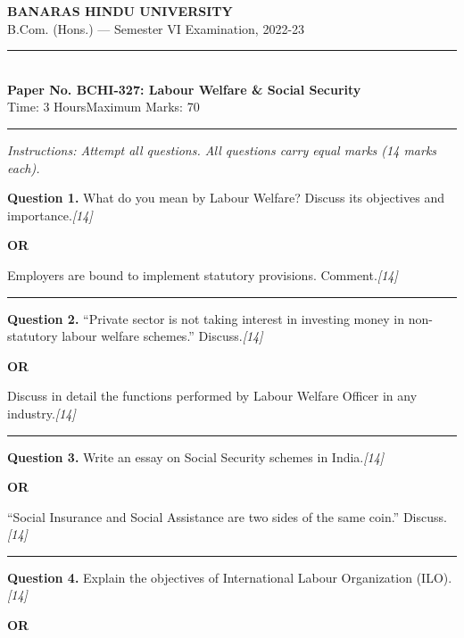 \documentclass[11pt,a4paper]{article}
\newcommand{\pts}[1]{\hfill   \textit{[#1]}}
\begin{document}
\begin{center}
  {\large\bfseries BANARAS HINDU UNIVERSITY}\\[2pt]
  {\normalsize B.Com. (Hons.) --- Semester VI Examination, 2022-23}\\[6pt]
  \rule{0.8\linewidth}{0.5pt}\\[6pt]
  {\large\bfseries Paper No. BCHI-327: Labour Welfare \& Social Security}\\[4pt]
  {\normalsize Time: 3 Hours\hfill Maximum Marks: 70}
\end{center}

\rule{\linewidth}{0.4pt}

\smallskip



\noindent   \textit{Instructions: Attempt all questions. All questions carry equal marks (14 marks each).}

\bigskip




\noindent   \textbf{Question 1.}
What do you mean by Labour Welfare? Discuss its objectives and importance.\pts{14}

\centerline{   \textbf{OR}}

Employers are bound to implement statutory provisions. Comment.\pts{14}

\medskip\rule{\linewidth}{0.2pt}




\noindent   \textbf{Question 2.}
``Private sector is not taking interest in investing money in non-statutory labour welfare schemes.'' Discuss.\pts{14}

\centerline{   \textbf{OR}}

Discuss in detail the functions performed by Labour Welfare Officer in any industry.\pts{14}

\medskip\rule{\linewidth}{0.2pt}




\noindent   \textbf{Question 3.}
Write an essay on Social Security schemes in India.\pts{14}

\centerline{   \textbf{OR}}

``Social Insurance and Social Assistance are two sides of the same coin.'' Discuss.\pts{14}

\medskip\rule{\linewidth}{0.2pt}




\noindent   \textbf{Question 4.}
Explain the objectives of International Labour Organization (ILO).\pts{14}

\centerline{   \textbf{OR}}
\end{document}
